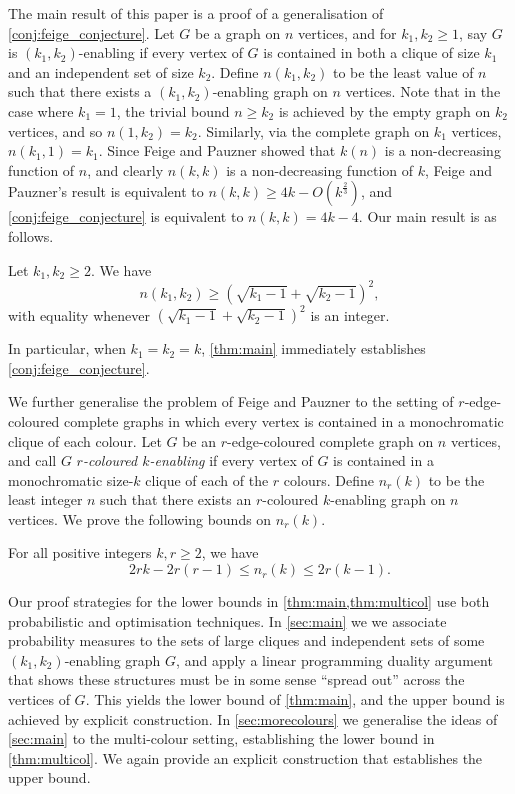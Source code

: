 \documentclass[12pt,a4paper]{article}
\begin{document}
The main result of this paper is a proof of a generalisation of \cref{conj:feige_conjecture}. Let $G$ be a graph on $n$ vertices, and for $k_1, k_2 \geq 1$, say $G$ is $(k_1, k_2)$-enabling if every vertex of $G$ is contained in both a clique of size $k_1$ and an independent set of size $k_2$. Define $n(k_1, k_2)$ to be the least value of $n$ such that there exists a $(k_1, k_2)$-enabling graph on $n$ vertices. Note that in the case where $k_1 = 1$, the trivial bound $n \geq k_2$ is achieved by the empty graph on $k_2$ vertices, and so $n(1,k_2) = k_2$. Similarly, via the complete graph on $k_1$ vertices, $n(k_1,1) = k_1$. Since Feige and Pauzner showed that $k(n)$ is a non-decreasing function of $n$, and clearly $n(k,k)$ is a non-decreasing function of $k$, Feige and Pauzner's result is equivalent to $n(k,k) \geq 4k - O(k^{\frac{2}{3}})$, and \cref{conj:feige_conjecture} is equivalent to $n(k,k) = 4k-4$. Our main result is as follows.

\begin{theorem} \label{thm:main} Let $k_1, k_2 \geq 2$. We have
    \begin{equation*}
        n(k_1, k_2) \geq \left(\sqrt{k_1-1} + \sqrt{k_2-1}\right)^2,
    \end{equation*}
    with equality whenever $\left(\sqrt{k_1-1} + \sqrt{k_2-1}\right)^2$ is an integer.
\end{theorem}
In particular, when $k_1 = k_2 = k$, \cref{thm:main} immediately establishes \cref{conj:feige_conjecture}. 

We further generalise the problem of Feige and Pauzner to the setting of $r$-edge-coloured complete graphs in which every vertex is contained in a monochromatic clique of each colour. Let $G$ be an $r$-edge-coloured complete graph on $n$ vertices, and call $G$ \emph{$r$-coloured $k$-enabling} if every vertex of $G$ is contained in a monochromatic size-$k$ clique of each of the $r$ colours. Define $n_r(k)$ to be the least integer $n$ such that there exists an $r$-coloured $k$-enabling graph on $n$ vertices. We prove the following bounds on $n_r(k)$.

\begin{theorem}\label{thm:multicol}
   For all positive integers $k, r \geq 2$, we have $$2rk - 2r(r-1) \leq n_r(k) \leq 2r(k-1).$$
\end{theorem}

Our proof strategies for the lower bounds in \cref{thm:main,thm:multicol} use both probabilistic and optimisation techniques. In \cref{sec:main} we we associate probability measures to the sets of large cliques and independent sets of some $(k_1,k_2)$-enabling graph $G$, and apply a linear programming duality argument that shows these structures must be in some sense ``spread out'' across the vertices of $G$. This yields the lower bound of \cref{thm:main}, and the upper bound is achieved by explicit construction. In \cref{sec:morecolours} we generalise the ideas of \cref{sec:main} to the multi-colour setting, establishing the lower bound in \cref{thm:multicol}. We again provide an explicit construction that establishes the upper bound.
\end{document}
